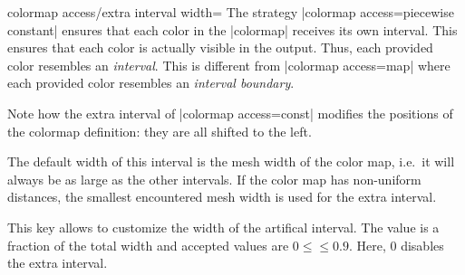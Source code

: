 \begin{pgfplotskey}{colormap access/extra interval width=}
	The strategy |colormap access=piecewise constant| ensures that each color in the |colormap| receives its own interval. This ensures that each color is actually visible in the output. Thus, each provided color resembles an \emph{interval}. This is different from |colormap access=map| where each provided color resembles an \emph{interval boundary}.
\begin{codeexample}[]
\pgfplotscolorbardrawstandalone[
	colormap={example}{%
		color(0)=(blue)
		color(500)=(red)
		color(1000)=(black)
	},
	colorbar horizontal,
	colorbar style={xtick=data},
	colormap access=const]
\end{codeexample}
	Note how the extra interval of |colormap access=const| modifies the positions of the colormap definition: they are all shifted to the left.
	
	The default width of this interval is the mesh width of the color map, i.e.\ it will always be as large as the other intervals. If the color map has non-uniform distances, the smallest encountered mesh width is used for the extra interval.

	This key allows to customize the width of the artifical interval. The value is a fraction of the total width and accepted values are $0\le $$\le 0.9$. Here, $0$ disables the extra interval. 

\begin{codeexample}[]
\pgfplotscolorbardrawstandalone[
	colormap={example}{%
		color(0)=(blue)
		color(500)=(red)
		color(1000)=(black)
	},
	colorbar horizontal,
	colorbar style={xtick=data},
	colormap access=const,
	colormap access/extra interval width=0]
\end{codeexample}


\end{pgfplotskey}
